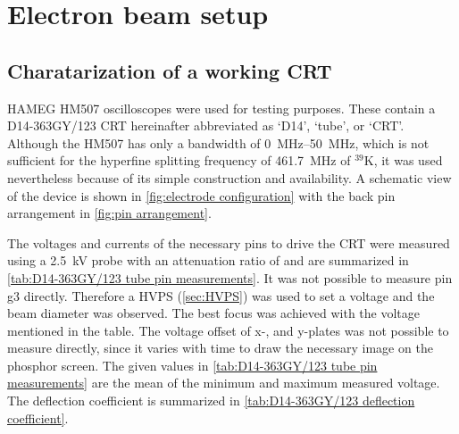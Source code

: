 \chapter{Electron beam setup}
\label{ch:Electron beam setup}

\section{Charatarization of a working CRT}
\label{sec:Charatarization of a working CRT}

HAMEG HM507 oscilloscopes \autocite{HM507-manual} were used for testing purposes. These contain a D14-363GY/123\autocite{D14363GY123-manual} CRT hereinafter abbreviated as `D14', `tube', or `CRT'. Although the HM507 has only a bandwidth of \SIrange{0}{50}{\mega\hertz}, which is not sufficient for the hyperfine splitting frequency of \SI{461.7}{\mega\hertz} of $^{39}\mathrm{K}$, it was used nevertheless because of its simple construction and availability. A schematic view of the device is shown in \cref{fig:electrode configuration} with the back pin arrangement in \cref{fig:pin arrangement}.

The voltages and currents of the necessary pins to drive the CRT were measured using a \SI{2.5}{\kilo\volt} probe  with an attenuation ratio of  and are summarized in \cref{tab:D14-363GY/123 tube pin measurements}. It was not possible to measure pin g3 directly. Therefore a HVPS (\cref{sec:HVPS}) was used to set a voltage and the beam diameter was observed. The best focus was achieved with the voltage mentioned in the table. The voltage offset of x-, and y-plates was not possible to measure directly, since it varies with time to draw the necessary image on the phosphor screen. The given values in \cref{tab:D14-363GY/123 tube pin measurements} are the mean of the minimum and maximum measured voltage. The deflection coefficient is summarized in \cref{tab:D14-363GY/123 deflection coefficient}.

